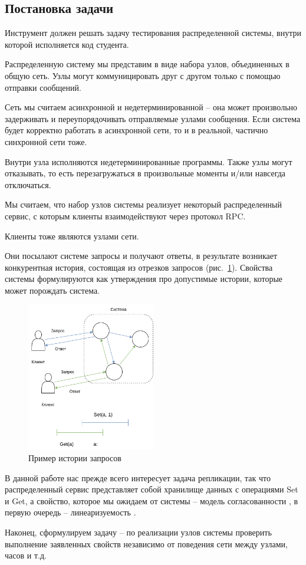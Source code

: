 \subsection{Постановка задачи}

Инструмент должен решать задачу тестирования распределенной системы, внутри которой исполняется код студента.

Распределенную систему мы представим в виде набора узлов, объединенных в общую сеть. Узлы могут коммуницировать друг с другом только с помощью отправки сообщений.

Сеть мы считаем асинхронной и недетерминированной – она может произвольно задерживать и переупорядочивать отправляемые узлами сообщения. Если система будет корректно работать в асинхронной сети, то и в реальной, частично синхронной сети тоже.

Внутри узла исполняются недетерминированные программы. Также узлы могут отказывать, то есть перезагружаться в произвольные моменты и/или навсегда отключаться.

Мы считаем, что набор узлов системы реализует некоторый распределенный сервис, с которым клиенты взаимодействуют через протокол RPC. 

Клиенты тоже являются узлами сети. 

Они посылают системе запросы и получают ответы, в результате возникает конкурентная история, состоящая из отрезков запросов (рис.~\ref{fig:history_example}). Свойства системы формулируются как утверждения про допустимые истории, которые может порождать система.

\begin{figure}[h]
    \centering
    \includegraphics[width=0.5\textwidth]{img/task.png}
    \caption{Пример истории запросов}
    \label{fig:history_example}
\end{figure}

В данной работе нас прежде всего интересует задача репликации, так что распределенный сервис  представляет собой хранилище данных с операциями Set и Get, а свойство, которое мы ожидаем от системы – модель согласованности \cite{consistency}, в первую очередь – линеаризуемость \cite{linearizability}.

Наконец, сформулируем задачу – по реализации узлов системы проверить выполнение заявленных свойств независимо от поведения сети между узлами, часов и т.д.
